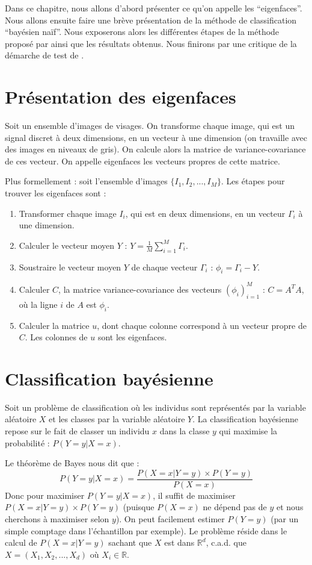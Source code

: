 Dans ce chapitre, nous allons d'abord présenter ce qu'on appelle les ``eigenfaces''.
Nous allons ensuite faire une brève présentation de la méthode de classification
``bayésien naïf''. Nous exposerons alors les différentes étapes de la méthode proposé
par \cite{article} ainsi que les résultats obtenus. Nous finirons par une critique de
la démarche de test de \cite{article}.

\section{Présentation des eigenfaces}
Soit un ensemble d'images de visages. On transforme chaque image, qui est un signal
discret à deux dimensions, en un vecteur à une dimension (on travaille avec des
images en niveaux de gris). On calcule alors la matrice de variance-covariance
de ces vecteur. On appelle eigenfaces les vecteurs propres de cette matrice.

Plus formellement : soit l'ensemble d'images $\{I_1, I_2, ..., I_M\}$.
Les étapes pour trouver les eigenfaces sont :
\begin{enumerate}
    \item Transformer chaque image $I_i$, qui est en deux dimensions,
    en un vecteur $\Gamma_i$ à une dimension.
    \item Calculer le vecteur moyen $Y$ : $Y = \frac{1}{M} \sum_{i=1}^M \Gamma_i$.
    \item Soustraire le vecteur moyen $Y$ de chaque vecteur $\Gamma_i$ : $\phi_i = \Gamma_i - Y$.
    \item Calculer $C$, la matrice variance-covariance des vecteurs $(\phi_i)_{i=1}^M$ :
    $C = A^TA$, où la ligne $i$ de $A$ est $\phi_i$.
    \item Calculer la matrice $u$, dont chaque colonne correspond à un vecteur
    propre de $C$. Les colonnes de $u$ sont les eigenfaces.
\end{enumerate}

\section{Classification bayésienne}
Soit un problème de classification où les individus sont représentés
par la variable aléatoire $X$ et les classes par la variable aléatoire $Y$.
La classification bayésienne repose sur le fait de classer un individu $x$ dans la
classe $y$ qui maximise la probabilité : $P(Y=y|X=x)$.

Le théorème de Bayes nous dit que :
\[
    P(Y=y|X=x) = \frac{P(X=x|Y=y) \times P(Y=y)}{P(X=x)}
\]
Donc pour maximiser $P(Y=y|X=x)$, il suffit de maximiser $P(X=x|Y=y) \times P(Y=y)$
(puisque $P(X=x)$ ne dépend pas de $y$ et nous cherchons à maximiser selon $y$).
On peut facilement estimer $P(Y=y)$ (par un simple comptage dans l'échantillon par exemple).
Le problème réside dans le calcul de $P(X=x|Y=y)$ sachant que $X$ est dans $\mathbb{R}^d$, 
c.a.d. que $X = (X_1, X_2, ..., X_d)$ où $X_i \in \mathbb{R}$.

